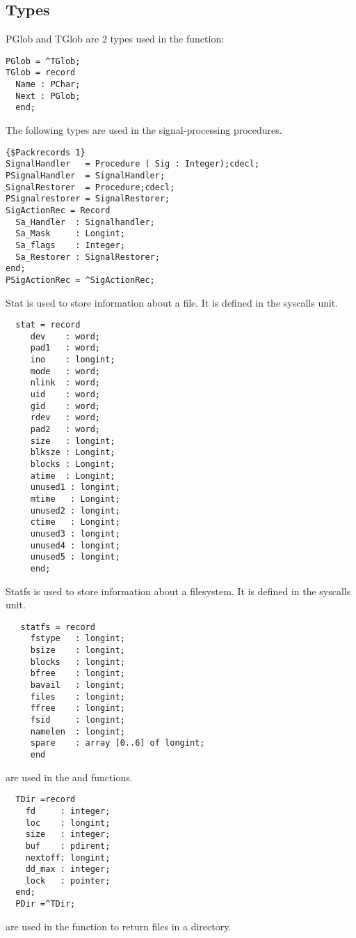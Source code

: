 \subsection{Types}
\label{sec:types}
PGlob and TGlob are 2 types used in the  function:
\begin{verbatim}
PGlob = ^TGlob;
TGlob = record
  Name : PChar;
  Next : PGlob;
  end;
\end{verbatim}
The following types are used in the signal-processing procedures.
\begin{verbatim}
{$Packrecords 1}
SignalHandler   = Procedure ( Sig : Integer);cdecl;
PSignalHandler  = SignalHandler;
SignalRestorer  = Procedure;cdecl;
PSignalrestorer = SignalRestorer;
SigActionRec = Record
  Sa_Handler  : Signalhandler;
  Sa_Mask     : Longint;
  Sa_flags    : Integer;
  Sa_Restorer : SignalRestorer;
end;
PSigActionRec = ^SigActionRec;
\end{verbatim}
Stat is used to store information about a file. It is defined in the
syscalls unit.
\begin{verbatim}
  stat = record
     dev    : word;
     pad1   : word;
     ino    : longint;
     mode   : word;
     nlink  : word;
     uid    : word;
     gid    : word;
     rdev   : word;
     pad2   : word;
     size   : longint;
     blksze : Longint;
     blocks : Longint;
     atime  : Longint;
     unused1 : longint;
     mtime   : Longint;
     unused2 : longint;
     ctime   : Longint;
     unused3 : longint;
     unused4 : longint;
     unused5 : longint;
     end;
 \end{verbatim}
Statfs is used to store information about a filesystem. It is defined in
the syscalls unit.
\begin{verbatim}
   statfs = record
     fstype   : longint;
     bsize    : longint;
     blocks   : longint;
     bfree    : longint;
     bavail   : longint;
     files    : longint;
     ffree    : longint;
     fsid     : longint;
     namelen  : longint; 
     spare    : array [0..6] of longint;
     end
\end{verbatim}
 are used in the  and 
functions. 
\begin{verbatim}
  TDir =record
    fd     : integer;
    loc    : longint;
    size   : integer;
    buf    : pdirent;
    nextoff: longint;
    dd_max : integer; 
    lock   : pointer;
  end;
  PDir =^TDir;
\end{verbatim}
 are used in the  function to return files in a directory.

